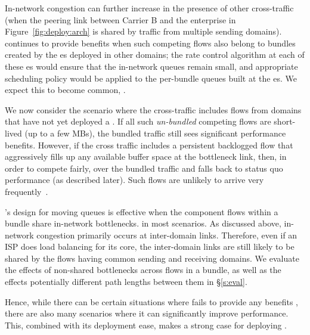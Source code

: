  In-network congestion can further increase in the presence of other cross-traffic (\eg when the peering link between Carrier B and the enterprise in Figure~\ref{fig:deploy:arch} is shared by traffic from multiple sending domains). \name continues to provide benefits when such competing flows also belong to bundles created by the {\inbox}es deployed in other domains; the rate control algorithm at each of these {\inbox}es would ensure that the in-network queues remain small, and appropriate scheduling policy would be applied to the per-bundle queues built at the {\inbox}es.
We expect this to become common, . 

 We now consider the scenario where the cross-traffic includes flows from domains that have not yet deployed a \name. If all such \emph{un-bundled} competing flows are short-lived (up to a few MBs), the bundled traffic still sees significant performance benefits. However, if the cross traffic includes a persistent backlogged flow that aggressively fills up any available buffer space at the bottleneck link, then, in order to compete fairly,  over the bundled traffic and falls back to status quo performance (as described later). Such flows are unlikely to arrive very frequently~\cite{caida-dataset}. 


 \name's design for moving queues is  effective when the component flows within a bundle share in-network bottlenecks. 
 in most scenarios. 
As discussed above, in-network congestion primarily occurs at inter-domain links. Therefore, even if an ISP does load balancing for its core, the inter-domain links are still likely to be shared by the flows having common sending and receiving domains. We evaluate the effects of non-shared bottlenecks across flows in a bundle, as well as the effects potentially different path lengths between them in \S\ref{s:eval}. 

\vspace{0.05in}
\noindent Hence, while there can be certain situations where \name fails to provide any benefits , there are also many scenarios where it can significantly improve performance. This, combined with its deployment ease, makes a strong case for deploying \name. 


